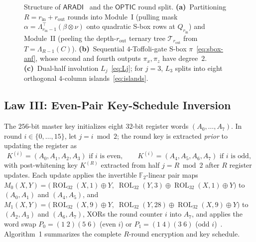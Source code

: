 \documentclass[11pt,a4paper]{article}
\theoremstyle{definition}
\theoremstyle{remark}
\newcommand{\Ftwo}{\mathbb{F}_2}
\newcommand{\ARADI}{\mathsf{ARADI}}
\newcommand{\OPTIC}{\mathsf{OPTIC}}
\newcommand{\ROL}{\operatorname{ROL}}
\begin{document}
\begin{figure}[t!]
\begin{tikzpicture}
\end{tikzpicture}
\caption{Structure of $\ARADI$~\cite{GMW24} and the $\OPTIC$ round split. \textbf{(a)}~Partitioning $R = r_{\text{in}} + r_{\text{out}}$ rounds into Module~I (pulling mask $\alpha = \Lambda_{r_{\text{in}}-1}^\top(\beta \otimes \nu)$ onto quadratic S-box rows at $Q_{r_{\text{in}}}$) and Module~II (peeling the depth-$r_{\text{out}}$ ternary tree $\mathcal{T}_{r_{\text{out}}}$ from $T = \Lambda_{R-1}(C)$). \textbf{(b)}~Sequential $4$-Toffoli-gate S-box $\pi$~\eqref{eq:sbox-anf}, whose second and fourth outputs $\pi_x, \pi_z$ have degree~$2$. \textbf{(c)}~Dual-half involution $L_j$~\eqref{eq:Lj}; for $j=3$, $L_3$ splits into eight orthogonal $4$-column islands~\eqref{eq:islands}.}
\label{fig:aradi-arch}
\end{figure}

\subsection{Law III: Even-Pair Key-Schedule Inversion}
The $256$-bit master key initializes eight $32$-bit register words $(A_0, \dots, A_7)$. In round $i \in \{0, \dots, 15\}$, let $j = i \bmod 2$; the round key is extracted \emph{prior} to updating the register as
\[
K^{(i)} = (A_0, A_1, A_2, A_3) \text{ if } i \text{ is even}, \qquad
K^{(i)} = (A_4, A_5, A_6, A_7) \text{ if } i \text{ is odd},
\]
with post-whitening key $K^{(R)}$ extracted from half $j = R \bmod 2$ after $R$ register updates. Each update applies the invertible $\Ftwo$-linear pair maps $M_0(X,Y) = \bigl(\ROL_{32}(X,1)\oplus Y,\; \ROL_{32}(Y,3)\oplus\ROL_{32}(X,1)\oplus Y\bigr)$ to $(A_0,A_1)$ and $(A_4,A_5)$, and $M_1(X,Y) = \bigl(\ROL_{32}(X,9)\oplus Y,\; \ROL_{32}(Y,28)\oplus\ROL_{32}(X,9)\oplus Y\bigr)$ to $(A_2,A_3)$ and $(A_6,A_7)$, XORs the round counter $i$ into $A_7$, and applies the word swap $P_0 = (1\;2)(5\;6)$ (even $i$) or $P_1 = (1\;4)(3\;6)$ (odd $i$)~\cite[Section~3.2, p.~7; Figure~3.3, p.~6; Figure~3.5, p.~8]{GMW24}. Algorithm~1 summarizes the complete $R$-round encryption and key schedule.
\end{document}
